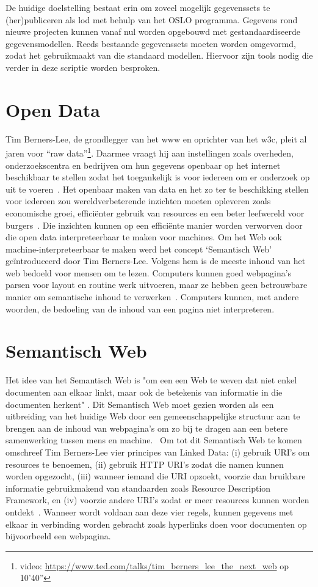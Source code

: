 De huidige doelstelling bestaat erin om zoveel mogelijk gegevenssets te (her)publiceren als \acrshort{lod} met behulp van het OSLO programma. Gegevens rond nieuwe projecten kunnen vanaf nul worden opgebouwd met gestandaardiseerde gegevensmodellen. Reeds bestaande gegevenssets moeten worden omgevormd, zodat het gebruikmaakt van die standaard modellen. Hiervoor zijn tools nodig die verder in deze scriptie worden besproken.

\section{Open Data}
\label{chap:intro}

Tim Berners-Lee, de grondlegger van het \acrfull{www} en oprichter van het \acrfull{w3c}, pleit al jaren voor ``raw data''\footnote{video:  \url{https://www.ted.com/talks/tim_berners_lee_the_next_web} op 10'40''}. Daarmee vraagt hij aan instellingen zoals overheden, onderzoekscentra en bedrijven om hun gegevens openbaar op het internet beschikbaar te stellen zodat het toegankelijk is voor iedereen om er onderzoek op uit te voeren~\cite{tedtalk}. Het openbaar maken van data en het zo ter te beschikking stellen voor iedereen zou wereldverbeterende inzichten moeten opleveren zoals economische groei, efficiënter gebruik van resources en een beter leefwereld voor burgers~\cite{tedtalka}. 
Die inzichten kunnen op een efficiënte manier worden verworven door die open data interpreteerbaar te maken voor machines. Om het Web ook machine-interpreteerbaar te maken werd het concept `Semantisch Web' geïntroduceerd door Tim Berners-Lee. Volgens hem is de meeste inhoud van het web bedoeld voor mensen om te lezen. Computers kunnen goed webpagina's parsen voor layout en routine werk uitvoeren, maar ze hebben geen betrouwbare manier om semantische inhoud te verwerken~\cite{tim_semanticweb}. Computers kunnen, met andere woorden, de bedoeling van de inhoud van een pagina niet interpreteren.

\section{Semantisch Web}
\label{semantisch_web}
Het idee van het Semantisch Web is "om een een Web te weven dat niet enkel documenten aan elkaar linkt, maar ook de betekenis van informatie in die documenten herkent" \cite{frauenfelder}.
Dit Semantisch Web moet gezien worden als een uitbreiding van het huidige Web door een gemeenschappelijke structuur aan te brengen aan de inhoud van webpagina's om zo bij te dragen aan een betere samenwerking tussen mens en machine.~\cite{kuck} Om tot dit Semantisch Web te komen omschreef Tim Berners-Lee vier principes van Linked Data: (i) gebruik URI's om resources te benoemen, (ii) gebruik HTTP URI's zodat die namen kunnen worden opgezocht, (iii) wanneer iemand die URI opzoekt, voorzie dan bruikbare informatie gebruikmakend van standaarden zoals Resource Description Framework, en (iv) voorzie andere URI's zodat er meer resources kunnen worden ontdekt~\cite{designissues}. Wanneer wordt voldaan aan deze vier regels, kunnen gegevens met elkaar in verbinding worden gebracht zoals hyperlinks doen voor documenten op bijvoorbeeld een webpagina.

